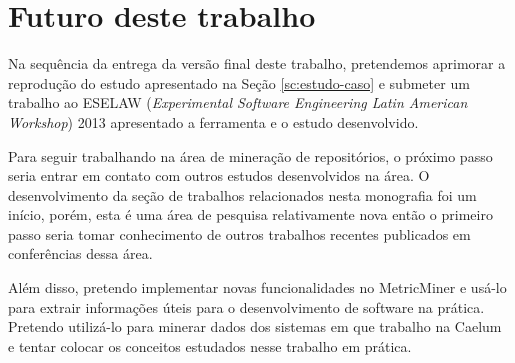 \documentclass[a4paper, 12pt, twoside]{book}
\begin{document}
    \section{Futuro deste trabalho}
    Na sequência da entrega da versão final deste trabalho, pretendemos aprimorar a reprodução do estudo apresentado na Seção \ref{sc:estudo-caso} e submeter um trabalho ao ESELAW (\textit{Experimental Software Engineering Latin American Workshop}) 2013 apresentado a ferramenta e o estudo desenvolvido.

    Para seguir trabalhando na área de mineração de repositórios, o próximo passo seria entrar em contato com outros estudos desenvolvidos na área. O desenvolvimento da seção de trabalhos relacionados nesta monografia foi um início, porém, esta é uma área de pesquisa relativamente nova então o primeiro passo seria tomar conhecimento de outros trabalhos recentes publicados em conferências dessa área.

    Além disso, pretendo implementar novas funcionalidades no MetricMiner e usá-lo para extrair informações úteis para o desenvolvimento de software na prática. Pretendo utilizá-lo para minerar dados dos sistemas em que trabalho na Caelum e tentar colocar os conceitos estudados nesse trabalho em prática.






\end{document}
